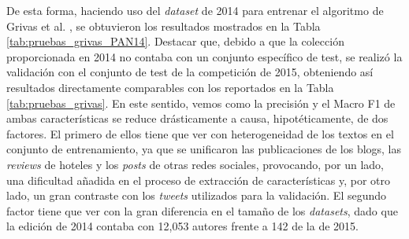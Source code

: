 {\bigskip
De esta forma, haciendo uso del \textit{dataset} de 2014 para entrenar el algoritmo de Grivas et al. \cite{grivas2015author}, se obtuvieron los resultados
mostrados en la Tabla \ref{tab:pruebas_grivas_PAN14}. Destacar que, debido a que la colección proporcionada en 2014 no contaba con un conjunto específico de test, se realizó la validación
con el conjunto de test de la competición de 2015, obteniendo así resultados directamente comparables con los reportados en la Tabla \ref{tab:pruebas_grivas}.
En este sentido, vemos como la precisión y el Macro F1 de ambas características se reduce drásticamente a causa, hipotéticamente, de dos factores. El primero de ellos
tiene que ver con heterogeneidad de los textos en el conjunto de entrenamiento, ya que se unificaron las publicaciones de los blogs, las \textit{reviews} de hoteles y
los \textit{posts} de otras redes sociales, provocando, por un lado, una dificultad añadida en el proceso de extracción de características y, por otro lado,
un gran contraste con los \textit{tweets} utilizados para la validación. El segundo factor tiene que ver con la gran diferencia en el tamaño de los \textit{datasets},
dado que la edición de 2014 contaba con 12,053 autores frente a 142 de la de 2015.

\bigskip
\begin{table}[H]
	\centering
	\caption{Resultados de las pruebas realizadas con el \textit{dataset} de 2014 para el algoritmo de Grivas et al. \cite{grivas2015author}}
	\label{tab:pruebas_grivas_PAN14}
\end{table}

}
